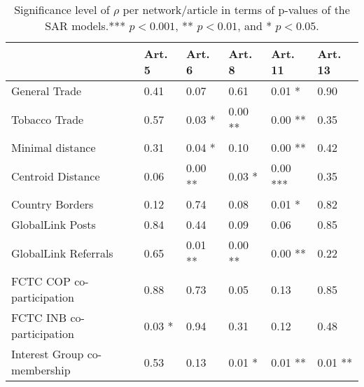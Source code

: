 \begin{table}[ht]
\centering
\begin{tabular}{llllll}
  \toprule
 & Art. 5 & Art. 6 & Art. 8 & Art. 11 & Art. 13 \\ 
  \midrule
General Trade & 0.41   & 0.07   & 0.61   & 0.01 * & 0.90   \\ 
  Tobacco Trade & 0.57   & 0.03 * & 0.00 ** & 0.00 ** & 0.35   \\ 
  Minimal distance & 0.31   & 0.04 * & 0.10   & 0.00 ** & 0.42   \\ 
  Centroid Distance & 0.06   & 0.00 ** & 0.03 * & 0.00 *** & 0.35   \\ 
  Country Borders & 0.12   & 0.74   & 0.08   & 0.01 * & 0.82   \\ 
  GlobalLink Posts & 0.84   & 0.44   & 0.09   & 0.06   & 0.85   \\ 
  GlobalLink Referrals & 0.65   & 0.01 ** & 0.00 ** & 0.00 ** & 0.22   \\ 
  FCTC COP co-participation & 0.88   & 0.73   & 0.05   & 0.13   & 0.85   \\ 
  FCTC INB co-participation & 0.03 * & 0.94   & 0.31   & 0.12   & 0.48   \\ 
   Interest Group co-membership & 0.53   & 0.13   & 0.01 * & 0.01 ** & 0.01 ** \\ 
   \bottomrule
\end{tabular}
\caption{Significance level of $\rho$ per network/article in terms of p-values of the SAR models.*** $p < 0.001$, ** $p < 0.01$, and * $p < 0.05$.} 
\end{table}
